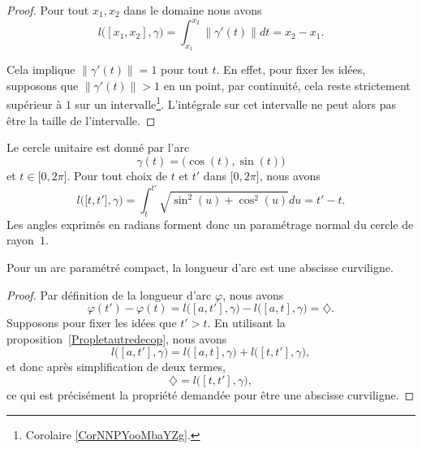 \begin{proof}
	Pour tout \( x_1,x_2\) dans le domaine nous avons
	\begin{equation}
		l\big( [x_1,x_2],\gamma \big)=\int_{x_1}^{x_2}\| \gamma'(t) \|dt=x_2-x_1.
	\end{equation}

	Cela implique \( \| \gamma'(t) \|=1\) pour tout \( t\). En effet, pour fixer les idées, supposons que \( \| \gamma'(t) \|>1\) en un point, par continuité, cela reste strictement supérieur à \( 1\) sur un intervalle\footnote{Corolaire \ref{CorNNPYooMbaYZg}.}. L'intégrale sur cet intervalle ne peut alors pas être la taille de l'intervalle.
\end{proof}

\begin{example}     \label{ExCerlceRadNorm}
	Le cercle unitaire est donné par l'arc
	\begin{equation}
		\gamma(t)=\big( \cos(t),\sin(t) \big)
	\end{equation}
	et \( t\in\mathopen[ 0 , 2\pi \mathclose]\). Pour tout choix de \( t\) et \( t'\) dans \( \mathopen[ 0 , 2\pi \mathclose]\), nous avons
	\begin{equation}
		l\big( \mathopen[ t , t' \mathclose],\gamma \big)=\int_t^{t'}\sqrt{\sin^2(u)+\cos^2(u)}du=t'-t.
	\end{equation}
	Les angles exprimés en radians forment donc un paramétrage normal du cercle de rayon~\( 1\).
\end{example}

\begin{lemma}
	Pour un arc paramétré compact, la longueur d'arc est une abscisse curviligne.
\end{lemma}

\begin{proof}
	Par définition de la longueur d'arc \( \varphi\), nous avons
	\begin{equation}
		\varphi(t')-\varphi(t)=l\big( [a,t'],\gamma \big)-l\big( [a,t],\gamma \big)=\diamondsuit.
	\end{equation}
	Supposons pour fixer les idées que \( t'>t\). En utilisant la proposition~\ref{Propletautredecop}, nous avons
	\begin{equation}
		l\big( [a,t'],\gamma \big)=l\big( [a,t],\gamma \big)+l\big( [t,t'],\gamma \big),
	\end{equation}
	et donc après simplification de deux termes,
	\begin{equation}
		\diamondsuit=l\big( [t,t'],\gamma \big),
	\end{equation}
	ce qui est précisément la propriété demandée pour être une abscisse curviligne.
\end{proof}

